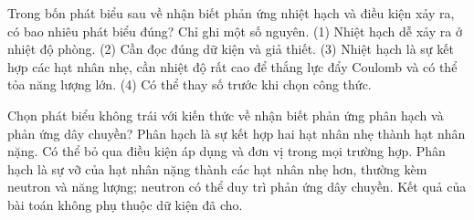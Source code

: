 \begin{ex}
Trong bốn phát biểu sau về nhận biết phản ứng nhiệt hạch và điều kiện xảy ra, có bao nhiêu phát biểu đúng? Chỉ ghi một số nguyên. (1) Nhiệt hạch dễ xảy ra ở nhiệt độ phòng. (2) Cần đọc đúng dữ kiện và giả thiết. (3) Nhiệt hạch là sự kết hợp các hạt nhân nhẹ, cần nhiệt độ rất cao để thắng lực đẩy Coulomb và có thể tỏa năng lượng lớn. (4) Có thể thay số trước khi chọn công thức.
\end{ex}

\begin{ex}
Chọn phát biểu không trái với kiến thức về nhận biết phản ứng phân hạch và phản ứng dây chuyền?
\choice
{Phân hạch là sự kết hợp hai hạt nhân nhẹ thành hạt nhân nặng.}
{Có thể bỏ qua điều kiện áp dụng và đơn vị trong mọi trường hợp.}
{\True Phân hạch là sự vỡ của hạt nhân nặng thành các hạt nhân nhẹ hơn, thường kèm neutron và năng lượng; neutron có thể duy trì phản ứng dây chuyền.}
{Kết quả của bài toán không phụ thuộc dữ kiện đã cho.}
\end{ex}

